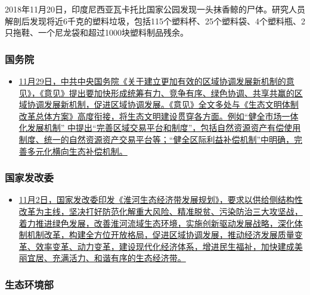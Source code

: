 \documentclass[
]{book}
\providecommand{\tightlist}{%
  \setlength{\itemsep}{0pt}\setlength{\parskip}{0pt}}
\begin{document}
2018年11月20日，印度尼西亚瓦卡托比国家公园发现一头抹香鲸的尸体。研究人员解剖后发现将近6千克的塑料垃圾，包括115个塑料杯、25个塑料袋、4个塑料瓶、2只拖鞋、一个尼龙袋和超过1000块塑料制品残余。

\hypertarget{ux56fdux52a1ux9662}{%
\subsubsection*{国务院}\label{ux56fdux52a1ux9662}}

\begin{itemize}
\tightlist
\item
  \href{http://www.gov.cn/xinwen/2018-11/29/content_5344537.htm}{11月29日，中共中央国务院《关于建立更加有效的区域协调发展新机制的意见》，《意见》提出要加快形成统筹有力、竞争有序、绿色协调、共享共赢的区域协调发展新机制，促进区域协调发展。《意见》全文多处与《生态文明体制改革总体方案》高度衔接，将生态文明建设贯穿各方面。例如``健全市场一体化发展机制'' 中提出``完善区域交易平台和制度''，包括自然资源资产有偿使用制度、统一的自然资源资产交易平台等；``健全区际利益补偿机制''中明确，完善多元化横向生态补偿机制。}
\end{itemize}

\hypertarget{ux56fdux5bb6ux53d1ux6539ux59d4}{%
\subsubsection*{国家发改委}\label{ux56fdux5bb6ux53d1ux6539ux59d4}}

\begin{itemize}
\tightlist
\item
  \href{http://www.ndrc.gov.cn/zcfb/zcfbghwb/201811/t20181107_919133.html}{11月2日，国家发改委印发《淮河生态经济带发展规划》，要求以供给侧结构性改革为主线，坚决打好防范化解重大风险、精准脱贫、污染防治三大攻坚战，着力推进绿色发展，改善淮河流域生态环境，实施创新驱动发展战略，深化体制机制改革，构建全方位开放格局，促进区域协调发展，推动经济发展质量变革、效率变革、动力变革，建设现代化经济体系，增进民生福祉，加快建成美丽宜居、充满活力、和谐有序的生态经济带。}
\end{itemize}

\hypertarget{ux751fux6001ux73afux5883ux90e8}{%
\subsubsection*{生态环境部}\label{ux751fux6001ux73afux5883ux90e8}}
\end{document}
